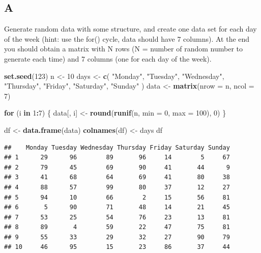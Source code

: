 \documentclass[
]{article}
\newenvironment{Shaded}{\begin{snugshade}}{\end{snugshade}}
\newcommand{\ControlFlowTok}[1]{\textcolor[rgb]{0.13,0.29,0.53}{\textbf{#1}}}
\newcommand{\DataTypeTok}[1]{\textcolor[rgb]{0.13,0.29,0.53}{#1}}
\newcommand{\DecValTok}[1]{\textcolor[rgb]{0.00,0.00,0.81}{#1}}
\newcommand{\KeywordTok}[1]{\textcolor[rgb]{0.13,0.29,0.53}{\textbf{#1}}}
\newcommand{\NormalTok}[1]{#1}
\newcommand{\OperatorTok}[1]{\textcolor[rgb]{0.81,0.36,0.00}{\textbf{#1}}}
\newcommand{\StringTok}[1]{\textcolor[rgb]{0.31,0.60,0.02}{#1}}
\begin{document}
\hypertarget{a-3}{%
\subsection{A}\label{a-3}}

Generate random data with some structure, and create one data set for
each day of the week (hint: use the for() cycle, data should have 7
columns). At the end you should obtain a matrix with N rows (N = number
of random number to generate each time) and 7 columns (one for each day
of the week).

\begin{Shaded}
\begin{Highlighting}[]
\KeywordTok{set.seed}\NormalTok{(}\DecValTok{123}\NormalTok{)}
\NormalTok{n \textless{}{-}}\StringTok{ }\DecValTok{10}
\NormalTok{days \textless{}{-}}\StringTok{ }\KeywordTok{c}\NormalTok{(}
  \StringTok{"Monday"}\NormalTok{,}
  \StringTok{"Tuesday"}\NormalTok{,}
  \StringTok{"Wednesday"}\NormalTok{,}
  \StringTok{"Thursday"}\NormalTok{,}
  \StringTok{"Friday"}\NormalTok{,}
  \StringTok{"Saturday"}\NormalTok{,}
  \StringTok{"Sunday"}
\NormalTok{)}
\NormalTok{data \textless{}{-}}\StringTok{ }\KeywordTok{matrix}\NormalTok{(}\DataTypeTok{nrow =}\NormalTok{ n, }\DataTypeTok{ncol =} \DecValTok{7}\NormalTok{)}

\ControlFlowTok{for}\NormalTok{ (i }\ControlFlowTok{in} \DecValTok{1}\OperatorTok{:}\DecValTok{7}\NormalTok{) \{}
\NormalTok{  data[, i] \textless{}{-}}\StringTok{ }\KeywordTok{round}\NormalTok{(}\KeywordTok{runif}\NormalTok{(n, }\DataTypeTok{min =} \DecValTok{0}\NormalTok{, }\DataTypeTok{max =} \DecValTok{100}\NormalTok{), }\DecValTok{0}\NormalTok{)}
\NormalTok{\}}

\NormalTok{df \textless{}{-}}\StringTok{ }\KeywordTok{data.frame}\NormalTok{(data)}
\KeywordTok{colnames}\NormalTok{(df) \textless{}{-}}\StringTok{ }\NormalTok{days}
\NormalTok{df}
\end{Highlighting}
\end{Shaded}

\begin{verbatim}
##    Monday Tuesday Wednesday Thursday Friday Saturday Sunday
## 1      29      96        89       96     14        5     67
## 2      79      45        69       90     41       44      9
## 3      41      68        64       69     41       80     38
## 4      88      57        99       80     37       12     27
## 5      94      10        66        2     15       56     81
## 6       5      90        71       48     14       21     45
## 7      53      25        54       76     23       13     81
## 8      89       4        59       22     47       75     81
## 9      55      33        29       32     27       90     79
## 10     46      95        15       23     86       37     44
\end{verbatim}
\end{document}
